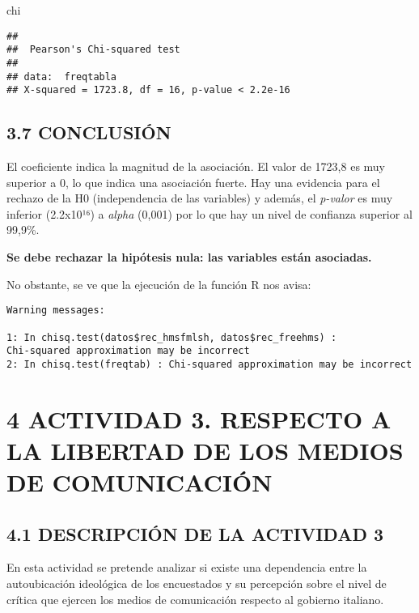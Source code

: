 \documentclass[
  12 pt,
  a4paper,
]{article}
\newenvironment{Shaded}{\begin{snugshade}}{\end{snugshade}}
\newcommand{\NormalTok}[1]{#1}
\begin{document}
\begin{Shaded}
\begin{Highlighting}[]
\NormalTok{chi}
\end{Highlighting}
\end{Shaded}

\begin{verbatim}
## 
##  Pearson's Chi-squared test
## 
## data:  freqtabla
## X-squared = 1723.8, df = 16, p-value < 2.2e-16
\end{verbatim}

\subsection{3.7 CONCLUSIÓN}\label{conclusiuxf3n-1}

El coeficiente indica la magnitud de la asociación. El valor de 1723,8
es muy superior a 0, lo que indica una asociación fuerte. Hay una
evidencia para el rechazo de la H0 (independencia de las variables) y
además, el \emph{p-valor} es muy inferior (2.2x10¹⁶) a \emph{alpha}
(0,001) por lo que hay un nivel de confianza superior al 99,9\%.

\textbf{Se debe rechazar la hipótesis nula: las variables están
asociadas.}

No obstante, se ve que la ejecución de la función R nos avisa:

\begin{verbatim}
Warning messages:

1: In chisq.test(datos$rec_hmsfmlsh, datos$rec_freehms) :
Chi-squared approximation may be incorrect
2: In chisq.test(freqtab) : Chi-squared approximation may be incorrect
\end{verbatim}

\newpage

\section{4 ACTIVIDAD 3. RESPECTO A LA LIBERTAD DE LOS MEDIOS DE
COMUNICACIÓN}\label{actividad-3.-respecto-a-la-libertad-de-los-medios-de-comunicaciuxf3n}

\subsection{4.1 DESCRIPCIÓN DE LA ACTIVIDAD
3}\label{descripciuxf3n-de-la-actividad-3}

En esta actividad se pretende analizar si existe una dependencia entre
la autoubicación ideológica de los encuestados y su percepción sobre el
nivel de crítica que ejercen los medios de comunicación respecto al
gobierno italiano.
\end{document}
